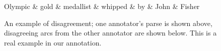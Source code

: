 \documentclass[11pt,a4paper]{article}
\newcommand{\yjcomment}[1]{\textcolor{orange}{[$_\mathrm{L}^\mathrm{Y}$#1]}}
\newcommand{\nascomment}[1]{\textcolor{blue}{[#1 ---\textsc{nas}]}}
\newcommand{\yicomment}[1]{\textcolor{gray}{[#1 ---\textsc{yi}]}}
\begin{document}


\begin{figure}
\centering
\small
\begin{dependency}[edge slant=2, text only label, label style=above]
	\begin{deptext}
		Olympic \& gold \& medallist \& whipped \& by \& John \& Fisher \\
	\end{deptext}
\end{dependency}
\caption{An example of disagreement; one annotator's parse is shown above, disagreeing arcs from the other
  annotator are shown below. This is a real example in our annotation.}\label{fig:disagree}
\end{figure}
\end{document}
